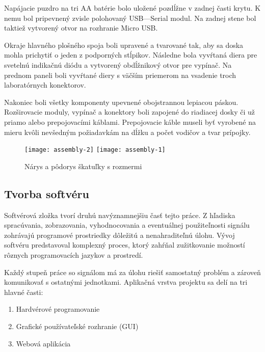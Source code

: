 \documentclass[titlepage,12pt]{article}
\begin{document}
Napájacie puzdro na tri AA batérie bolo uložené pozdĺžne v zadnej časti krytu. K nemu bol pripevnený zvisle polohovaný USB—Serial modul. Na zadnej stene bol taktiež vytvorený otvor na rozhranie Micro USB.

Okraje hlavného plošného spoja boli upravené a tvarované tak, aby sa doska mohla prichytiť o jeden z podporných stĺpikov. Následne bola vyvŕtaná diera pre svetelnú indikačnú diódu a vytvorený obdĺžnikový otvor pre vypínač. Na prednom paneli boli vyvŕtané diery s väčším priemerom na vsadenie troch laboratórnych konektorov.

Nakoniec boli všetky komponenty upevnené obojstrannou lepiacou páskou. Rozširovacie moduly, vypínač a konektory boli zapojené do riadiacej dosky či už priamo alebo prepojovacími káblami. Prepojovacie káble museli byť vyrobené na mieru kvôli nevšedným požiadavkám na dĺžku a počet vodičov a tvar prípojky.


\begin{figure}[!ht]
\begin{center}
\texttt{[image: assembly-2]}
\texttt{[image: assembly-1]}
\caption{Nárys a pôdorys škatuľky s rozmermi}
\end{center}
\end{figure}

\newpage
\subsection{Tvorba softvéru}
Softvérová zložka tvorí druhú navýznamnejšiu časť tejto práce. Z hľadiska spracúvania, zobrazovania, vyhodnocovania a eventuálnej použiteľnosti signálu zohrávajú programové prostriedky dôležitú a nenahraditeľnú úlohu. Vývoj softvéru predstavoval komplexný proces, ktorý zahŕňal zužitkovanie možností rôznych programovacích jazykov a prostredí.

Každý stupeň práce so signálom má za úlohu riešiť samostatný problém a zároveň komunikovať s ostatnými jednotkami. Aplikačná vrstva projektu sa delí na tri hlavné časti:
\begin{enumerate}
	\item Hardvérové programovanie
	\item Grafické používateľské rozhranie (GUI)
	\item Webová aplikácia
\end{enumerate}
\end{document}
